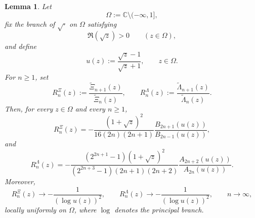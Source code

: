 \documentclass[11pt,twoside]{article}
\newtheorem{lemma}[theorem]{Lemma}
\numberwithin{equation}{section}
\begin{document}
\begin{lemma}\label{lem:ratio-asymptotics}
Let
\[
\Omega:=\mathbb C\setminus(-\infty,1],
\]
fix the branch of \(\sqrt{\cdot}\) on \(\Omega\) satisfying
\[
\Re(\sqrt z)>0 \qquad (z\in\Omega),
\]
and define
\[
u(z):=\frac{\sqrt z-1}{\sqrt z+1},
\qquad z\in\Omega.
\]
For \(n\ge1\), set
\[
R_n^\Xi(z):=\frac{\widetilde{\Xi}_{n+1}(z)}{\widetilde{\Xi}_n(z)},
\qquad
R_n^\Lambda(z):=\frac{\widetilde{\Lambda}_{n+1}(z)}{\widetilde{\Lambda}_n(z)}.
\]
Then, for every \(z\in\Omega\) and every \(n\ge1\),
\[
R_n^\Xi(z)
=
-\frac{(1+\sqrt z)^2}{16(2n)(2n+1)}
\frac{B_{2n+1}(u(z))}{B_{2n-1}(u(z))},
\]
and
\[
R_n^\Lambda(z)
=
-\frac{(2^{2n+1}-1)(1+\sqrt z)^2}{(2^{2n+3}-1)(2n+1)(2n+2)}
\frac{A_{2n+2}(u(z))}{A_{2n}(u(z))}.
\]
Moreover,
\[
R_n^\Xi(z)\longrightarrow -\frac{1}{(\log u(z))^2},
\qquad
R_n^\Lambda(z)\longrightarrow -\frac{1}{(\log u(z))^2},
\qquad n\to\infty,
\]
locally uniformly on \(\Omega\), where \(\log\) denotes the principal branch.
\end{lemma}
\end{document}
